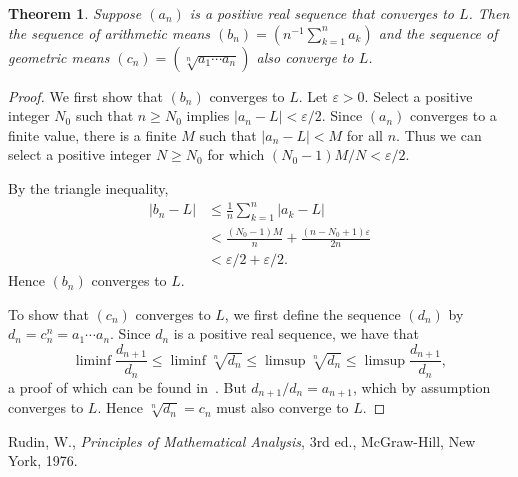 \documentclass[12pt]{article}
\newtheorem*{theorem*}{Theorem}
\begin{document}

\begin{theorem*}
Suppose $(a_n)$ is a positive real sequence that converges to $L$.  Then 
the sequence of arithmetic means $(b_n)=(n^{-1}\sum_{k=1}^na_k)$ and the sequence of geometric means $(c_n)=(\sqrt[n]{a_1\cdots a_n})$ also converge to $L$.
\end{theorem*}

\begin{proof}
We first show that $(b_n)$ converges to $L$.  Let $\varepsilon>0$.  Select a positive integer $N_0$ such that $n\ge N_0$ implies $|a_n-L|<\varepsilon/2$.  Since $(a_n)$ converges to a finite value, there is a finite $M$ such that 
$|a_n-L|<M$ for all $n$.  Thus we can select a positive integer $N\ge N_0$ for which $(N_0-1)M/N<\varepsilon/2$.  

By the triangle inequality,
\begin{align*}
|b_n-L|
&\le\frac{1}{n}\sum_{k=1}^n|a_k-L| \\
&<\frac{(N_0-1)M}{n}+\frac{(n-N_0+1)\varepsilon}{2n} \\
&<\varepsilon/2+\varepsilon/2.
\end{align*}
Hence $(b_n)$ converges to $L$.

To show that $(c_n)$ converges to $L$, we first define the sequence $(d_n)$ 
by $d_n=c_n^n=a_1\cdots a_n$.  Since $d_n$ is a positive real sequence, we have that
\[
\liminf \frac{d_{n+1}}{d_n} \le
\liminf \sqrt[n]{d_n}       \le
\limsup \sqrt[n]{d_n}       \le
\limsup \frac{d_{n+1}}{d_n},
\]
a proof of which can be found in~\cite{Ru}.  But $d_{n+1}/d_n=a_{n+1}$, which by assumption converges to $L$.  Hence $\sqrt[n]{d_n}=c_n$ must also converge to $L$.
\end{proof}

\begin{thebibliography}{1}
Rudin, W., \emph{Principles of Mathematical Analysis}, 3rd ed., McGraw-Hill, New York, 1976.
\end{thebibliography}
\end{document}
